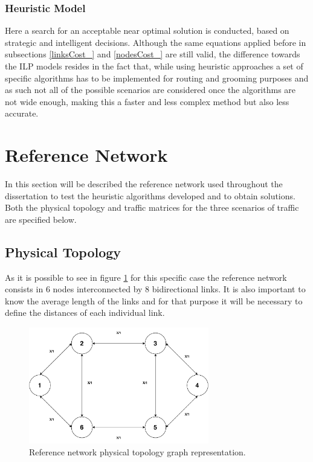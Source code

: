 \subsubsection{Heuristic Model}

Here a search for an acceptable near optimal solution is conducted, based on strategic and intelligent decisions. Although the same equations applied before in subsections \ref{linksCost_} and \ref{nodesCost_} are still valid, the difference towards the ILP models resides in the fact that, while using heuristic approaches a set of specific algorithms has to be implemented for routing and grooming purposes and as such not all of the possible scenarios are considered once the algorithms are not wide enough, making this a faster and less complex method but also less accurate.  


\section{Reference Network}
\label{referenceNetwork}

In this section will be described the  reference network used throughout the dissertation to test the heuristic algorithms developed and to obtain solutions. Both the physical topology
and traffic matrices for the three scenarios of traffic are specified below.

\subsection{Physical Topology}

As it is possible to see in figure \ref{referencePhysical} for this specific case the reference network consists in 6 nodes interconnected by 8 bidirectional links. It is also important to know the average length of the links and for that purpose it will be necessary to define the distances of each individual link.

\begin{figure}[H]
  \begin{center}
    \includegraphics[width=0.7\textwidth]{fig/logos/physicalTopology.pdf}
    \caption{Reference network physical topology graph representation.}
  \end{center}
   \label{referencePhysical}
\end{figure}

